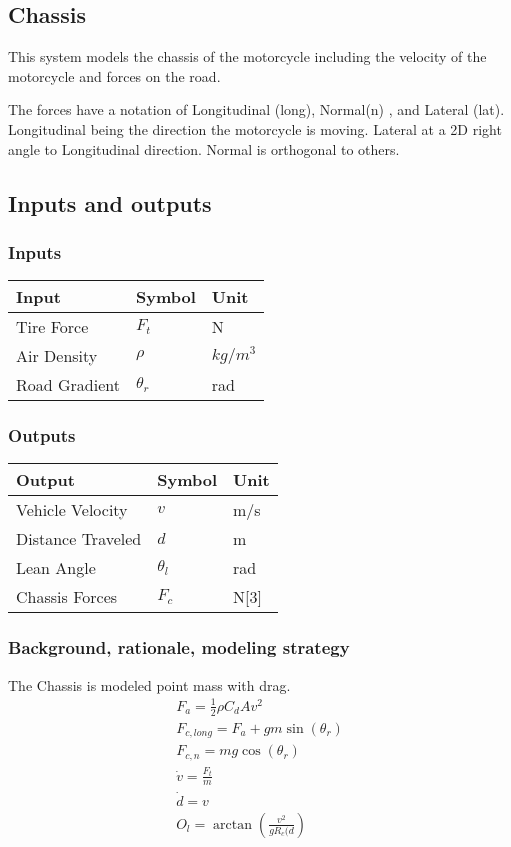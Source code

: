 \documentclass[../SimBALink.tex]{subfiles}
\begin{document}
\subsection{Chassis} This system models the chassis of the motorcycle including the velocity of the motorcycle and forces on the road.

The forces have a notation of Longitudinal (long), Normal(n) , and Lateral (lat). Longitudinal being the direction the motorcycle is moving. Lateral at a 2D right angle to Longitudinal direction. Normal is orthogonal to others. 

\subsection{Inputs and outputs}
	\subsubsection{Inputs}
	\begin{tabular}{ l | l | l  }
		Input					&	Symbol		&	Unit		\\	\hline
		Tire Force				& 	$F_t$ 		&	N \\		
		Air Density 			&	$\rho$		& $kg/m^3$ \\
		Road Gradient			&	$\theta_r$  & rad
	\end{tabular}
	
	\subsubsection{Outputs}
	\begin{tabular}{ l | l | l  }
		Output					&	Symbol		&	Unit		\\	\hline
		Vehicle Velocity		&	$v$			&	m/s \\
		Distance Traveled		&	$d$			&	m \\
		Lean Angle 				&	$\theta_l$	&   rad	\\
		Chassis Forces			&	$F_c$		&	N[3]
	\end{tabular}

\subsubsection{Background, rationale, modeling strategy}
The Chassis is modeled point mass with drag.
\begin{gather}
		F_a = \frac{1}{2} \rho C_dAv^2 \\
		F_{c,long}  = F_a + gm\sin(\theta_r)  \\
		F_{c,n} = mg\cos(\theta_r) \\
		\dot{v} = \frac{F_t}{m} \\
		\dot{d} = v \\
		O_l = \arctan(\frac{v^2}{gR_c(d})
\end{gather}
\end{document}
